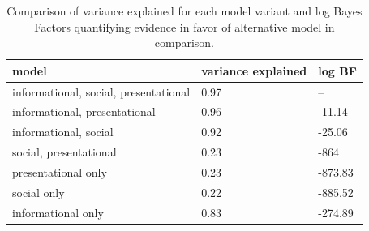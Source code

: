 \documentclass[9pt,twocolumn,twoside,lineno]{main_class_file}
\begin{document}
\begin{table}[tbp]
\begin{center}
\begin{threeparttable}
\caption{\label{tab:comparisonTable}Comparison of variance explained for each model variant and log Bayes Factors quantifying evidence in favor of alternative model in comparison.}
\begin{tabular}{lll}
\toprule
model & \multicolumn{1}{c}{variance
explained} & \multicolumn{1}{c}{log BF}\\
\midrule
informational,
social,
presentational & 0.97 & --\\
informational,
presentational & 0.96 & -11.14\\
informational,
social & 0.92 & -25.06\\
social,
presentational & 0.23 & -864\\
presentational
only & 0.23 & -873.83\\
social only & 0.22 & -885.52\\
informational
only & 0.83 & -274.89\\
\bottomrule
\end{tabular}
\end{threeparttable}
\end{center}
\end{table}
\end{document}
